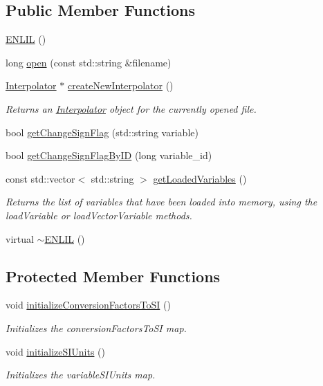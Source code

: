 \subsection*{Public Member Functions}
\begin{DoxyCompactItemize}
\item 
\hyperlink{classccmc_1_1_e_n_l_i_l_a38a8d599775cb5da6be25288b9bb5ae1}{E\-N\-L\-I\-L} ()
\item 
long \hyperlink{classccmc_1_1_e_n_l_i_l_a7a1ec843b7fc7a86d6b8e2ac3d65b41f}{open} (const std\-::string \&filename)
\item 
\hyperlink{classccmc_1_1_interpolator}{Interpolator} $\ast$ \hyperlink{classccmc_1_1_e_n_l_i_l_a861fdf6c5b4f73d0e0b4cfc66f55598b}{create\-New\-Interpolator} ()
\begin{DoxyCompactList}\small\item\em Returns an \hyperlink{classccmc_1_1_interpolator}{Interpolator} object for the currently opened file.  \end{DoxyCompactList}\item 
bool \hyperlink{classccmc_1_1_e_n_l_i_l_a109de918c637e24533e88100f1ae53bd}{get\-Change\-Sign\-Flag} (std\-::string variable)
\item 
bool \hyperlink{classccmc_1_1_e_n_l_i_l_a93e9e996febbd953b69b6e7c30b999ac}{get\-Change\-Sign\-Flag\-By\-I\-D} (long variable\-\_\-id)
\item 
const std\-::vector$<$ std\-::string $>$ \hyperlink{classccmc_1_1_e_n_l_i_l_a7ca1f6462dca9d534781d4b8c4206d35}{get\-Loaded\-Variables} ()
\begin{DoxyCompactList}\small\item\em Returns the list of variables that have been loaded into memory, using the load\-Variable or load\-Vector\-Variable methods. \end{DoxyCompactList}\item 
virtual \hyperlink{classccmc_1_1_e_n_l_i_l_a7f0df091dd0047b5c3401a22f362e0d6}{$\sim$\-E\-N\-L\-I\-L} ()
\end{DoxyCompactItemize}
\subsection*{Protected Member Functions}
\begin{DoxyCompactItemize}
\item 
void \hyperlink{classccmc_1_1_e_n_l_i_l_afff7548cddd78a77eaa0322a45415ab6}{initialize\-Conversion\-Factors\-To\-S\-I} ()
\begin{DoxyCompactList}\small\item\em Initializes the conversion\-Factors\-To\-S\-I map.  \end{DoxyCompactList}\item 
void \hyperlink{classccmc_1_1_e_n_l_i_l_aa4d5d805912f4abfdd65083424ebb000}{initialize\-S\-I\-Units} ()
\begin{DoxyCompactList}\small\item\em Initializes the variable\-S\-I\-Units map.  \end{DoxyCompactList}\end{DoxyCompactItemize}
